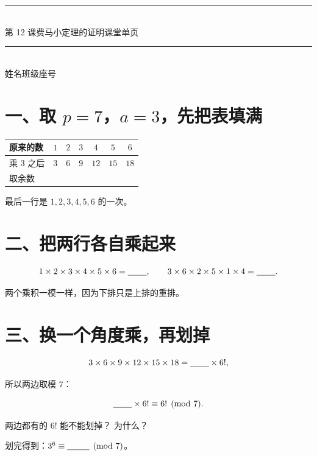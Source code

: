 \documentclass[11pt]{ctexart}
\newcommand{\biaoti}[2]{%
  {\color{pagegreen}\rule{\textwidth}{1.2pt}}\\[6pt]
  {\heiti\Large 第 #1 课\quad #2}\hfill{\small\songti 课堂单页}\\[6pt]
  {\color{pagegreen}\rule{\textwidth}{0.5pt}}\\[4pt]
  {\small 姓名\underline{\hspace{3.2cm}}\qquad 班级\underline{\hspace{2.4cm}}\qquad 座号\underline{\hspace{1.6cm}}}
  \vspace{0.3em}
}
\begin{document}
\biaoti{12}{费马小定理的证明}

\section*{一、取 \(p=7\)，\(a=3\)，先把表填满}

\begin{center}
{\small
\begin{tabular}{@{}lcccccc@{}}
  \toprule
  原来的数 & \(1\) & \(2\) & \(3\) & \(4\) & \(5\) & \(6\) \\
  \midrule
  乘 \(3\) 之后 & \(3\) & \(6\) & \(9\) & \(12\) & \(15\) & \(18\) \\
  \rule{0pt}{2.8ex}取余数 & & & & & & \\
  \bottomrule
\end{tabular}}
\end{center}

\noindent 最后一行是 \(1,2,3,4,5,6\) 的一次\underline{\hspace{4em}}。

\section*{二、把两行各自乘起来}

\[
  1\times2\times3\times4\times5\times6=\underline{\hspace{2.2em}},
  \qquad
  3\times6\times2\times5\times1\times4=\underline{\hspace{2.2em}} .
\]

\noindent 两个乘积一模一样，因为下排只是上排的重排。

\section*{三、换一个角度乘，再划掉}

\[
  3\times6\times9\times12\times15\times18
  =\underline{\hspace{2.2em}}\times 6! ,
\]

\noindent 所以两边取模 \(7\)：

\[
  \underline{\hspace{2.2em}}\times6!\equiv 6! \pmod 7 .
\]

\noindent 两边都有的 \(6!\) 能不能划掉？\underline{\hspace{2.6em}}\qquad
为什么？\underline{\hspace{6em}}

\vspace{0.2em}
\noindent 划完得到：\(3^{6}\equiv\underline{\hspace{2.6em}}\pmod 7\)。
\end{document}
